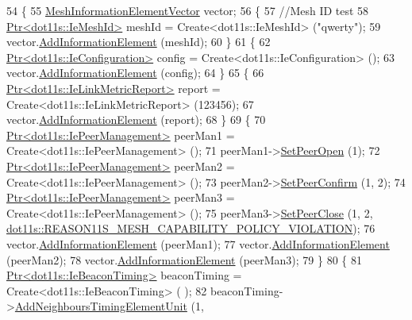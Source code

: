 \begin{DoxyCode}
54 \{
55   \hyperlink{classns3_1_1MeshInformationElementVector}{MeshInformationElementVector} vector;
56   \{
57     \textcolor{comment}{//Mesh ID test}
58     \hyperlink{classns3_1_1Ptr}{Ptr<dot11s::IeMeshId>} meshId = Create<dot11s::IeMeshId> (\textcolor{stringliteral}{"qwerty"});
59     vector.\hyperlink{classns3_1_1WifiInformationElementVector_aa28c3ec3babb8fd9622c424b5e0beb3f}{AddInformationElement} (meshId);
60   \}
61   \{
62     \hyperlink{classns3_1_1Ptr}{Ptr<dot11s::IeConfiguration>} config = Create<dot11s::IeConfiguration> ();
63     vector.\hyperlink{classns3_1_1WifiInformationElementVector_aa28c3ec3babb8fd9622c424b5e0beb3f}{AddInformationElement} (config);
64   \}
65   \{
66     \hyperlink{classns3_1_1Ptr}{Ptr<dot11s::IeLinkMetricReport>} report = 
      Create<dot11s::IeLinkMetricReport> (123456);
67     vector.\hyperlink{classns3_1_1WifiInformationElementVector_aa28c3ec3babb8fd9622c424b5e0beb3f}{AddInformationElement} (report);
68   \}
69   \{
70     \hyperlink{classns3_1_1Ptr}{Ptr<dot11s::IePeerManagement>} peerMan1 = Create<dot11s::IePeerManagement> 
      ();
71     peerMan1->\hyperlink{classns3_1_1dot11s_1_1IePeerManagement_a8a148e933b7ea49cdad661f0d18357df}{SetPeerOpen} (1);
72     \hyperlink{classns3_1_1Ptr}{Ptr<dot11s::IePeerManagement>} peerMan2 = Create<dot11s::IePeerManagement> 
      ();
73     peerMan2->\hyperlink{classns3_1_1dot11s_1_1IePeerManagement_a74a7ff00dbc4a2bbe0bf28b746ffb53e}{SetPeerConfirm} (1, 2);
74     \hyperlink{classns3_1_1Ptr}{Ptr<dot11s::IePeerManagement>} peerMan3 = Create<dot11s::IePeerManagement> 
      ();
75     peerMan3->\hyperlink{classns3_1_1dot11s_1_1IePeerManagement_a9f112351e19200bcac0b8ca56c98ec0b}{SetPeerClose} (1, 2, 
      \hyperlink{group__dot11s_gga1132ec5975c87960ceb86ea54481aba6aae9441b25fc7316ae53a6e73398521e5}{dot11s::REASON11S\_MESH\_CAPABILITY\_POLICY\_VIOLATION});
76     vector.\hyperlink{classns3_1_1WifiInformationElementVector_aa28c3ec3babb8fd9622c424b5e0beb3f}{AddInformationElement} (peerMan1);
77     vector.\hyperlink{classns3_1_1WifiInformationElementVector_aa28c3ec3babb8fd9622c424b5e0beb3f}{AddInformationElement} (peerMan2);
78     vector.\hyperlink{classns3_1_1WifiInformationElementVector_aa28c3ec3babb8fd9622c424b5e0beb3f}{AddInformationElement} (peerMan3);
79   \}
80   \{
81     \hyperlink{classns3_1_1Ptr}{Ptr<dot11s::IeBeaconTiming>}  beaconTiming = Create<dot11s::IeBeaconTiming> (
      );
82     beaconTiming->\hyperlink{classns3_1_1dot11s_1_1IeBeaconTiming_a35cd08748c0be3e098a50f4fa870f74f}{AddNeighboursTimingElementUnit} (1, 

\end{DoxyCode}
